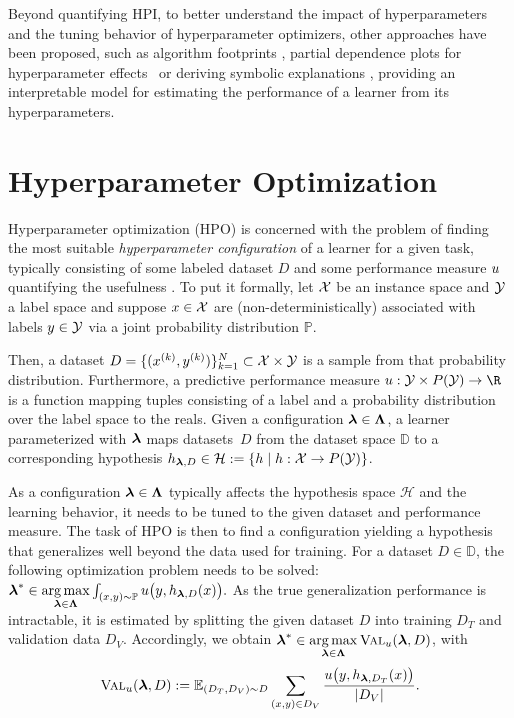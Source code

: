 \documentclass[letterpaper]{article} %
\begin{document}
Beyond quantifying HPI, to better understand the impact of hyperparameters and the tuning behavior of hyperparameter optimizers, other approaches have been proposed, such as algorithm footprints \citep{DBLP:conf/cec/Smith-MilesT12}, partial dependence plots for hyperparameter effects~\cite{DBLP:conf/nips/MoosbauerHCLB21} or deriving symbolic explanations \citep{DBLP:conf/automl/SegelGTBL23}, providing an interpretable model for estimating the performance of a learner from its hyperparameters.



\section{Hyperparameter Optimization}
Hyperparameter optimization (HPO) is concerned with the problem of finding the most suitable \textit{hyperparameter configuration} of a learner for a given task, typically consisting of some labeled dataset $D$ and some performance measure $u$ quantifying the usefulness \citep{DBLP:journals/widm/BischlBLPRCTUBBDL23}.
To put it formally, let $\mathcal{X}$ be an instance space and $\mathcal{Y}$ a label space and suppose $x\in \mathcal{X}$ are (non-deterministically) associated with labels $y \in \mathcal{Y}$ via a joint probability distribution $\mathbb{P}$.

Then, a dataset $D=\{ (x^{(k)}, y^{(k)}) \}_{k=1}^N \subset \mathcal{X} \times \mathcal{Y}$ is a sample from that probability distribution.
Furthermore, a predictive performance measure $\perf: \cY \times P(\cY) \rightarrow \R$ is a function mapping tuples consisting of a label and a probability distribution over the label space to the reals.
Given a configuration $\boldsymbol{\lambda} \in \boldsymbol{\Lambda}$, a learner parameterized with $\boldsymbol{\lambda}$ maps datasets~$D$ from the dataset space $\mathbb{D}$ to a corresponding hypothesis $h_{\boldsymbol{\lambda}, D} \in \mathcal{H} := \{ h \mid h: \mathcal{X} \rightarrow P(\mathcal{Y}) \}$.

As a configuration $\boldsymbol{\lambda}\in\boldsymbol{\Lambda}$ typically affects the hypothesis space $\mathcal{H}$ and the learning behavior, it needs to be tuned to the given dataset and performance measure. The task of HPO is then to find a configuration yielding a hypothesis that generalizes well beyond the data used for training.
For a dataset $D\in\mathbb{D}$, the following optimization problem needs to be solved:
$
\boldsymbol{\lambda}^\ast \in \underset{\boldsymbol{\lambda}\in\boldsymbol{\Lambda}}{\arg\max} \int_{(x, y)\sim \mathbb{P}} u \big(y, h_{\boldsymbol{\lambda}, D}(x)\big).
$
As the true generalization performance is intractable, it is estimated by splitting the given dataset $D$ into training $D_{T}$ and validation data $D_{V}$. Accordingly, we obtain $\boldsymbol{\lambda}^\ast \in \underset{\boldsymbol{\lambda}\in\boldsymbol{\Lambda}}{\arg\max}\, \textsc{Val}_u(\boldsymbol{\lambda}, D)$, with
\[
\textsc{Val}_u(\boldsymbol{\lambda}, D) := 
\mathbb{E}_{(D_{T}, D_{V}) \sim D} \sum_{(x, y) \in D_{V}} \frac{u \big(y, h_{\boldsymbol{\lambda}, D_{T}}(x)\big)}{|D_V|} .
\]
\end{document}
